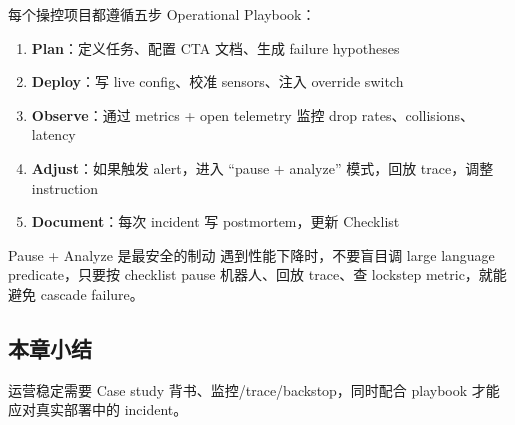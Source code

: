 每个操控项目都遵循五步 Operational Playbook：

\begin{enumerate}
    \item \textbf{Plan}：定义任务、配置 CTA 文档、生成 failure hypotheses
    \item \textbf{Deploy}：写 live config、校准 sensors、注入 override switch
    \item \textbf{Observe}：通过 metrics + open telemetry 监控 drop rates、collisions、latency
    \item \textbf{Adjust}：如果触发 alert，进入 “pause + analyze” 模式，回放 trace，调整 instruction
    \item \textbf{Document}：每次 incident 写 postmortem，更新 Checklist
\end{enumerate}

\begin{warningbox}{Pause + Analyze 是最安全的制动}
遇到性能下降时，不要盲目调 large language predicate，只要按 checklist pause 机器人、回放 trace、查 lockstep metric，就能避免 cascade failure。
\end{warningbox}

\subsection{本章小结}

运营稳定需要 Case study 背书、监控/trace/backstop，同时配合 playbook 才能应对真实部署中的 incident。

\newpage

